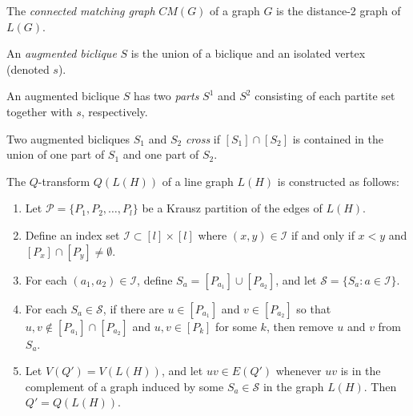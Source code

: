 



\begin{mydef}
	The \textit{connected matching graph} $CM(G)$ of a graph $G$ is the distance-2 graph of $L(G)$.
\end{mydef}

\begin{mydef}
	An \textit{augmented biclique} $S$ is the union of a biclique and an isolated vertex (denoted $s$).
\end{mydef}

\begin{mydef}
	An augmented biclique $S$ has two \textit{parts} $S^1$ and $S^2$ consisting of each partite set together with $s$, respectively. 
\end{mydef}

\begin{mydef}
	Two augmented bicliques $S_1$ and $S_2$ \textit{cross} if $[S_1] \cap [S_2]$ is contained in the union of one part of $S_1$ and one part of $S_2$.
\end{mydef}

\begin{mydef}
	The $Q$-transform $Q(L(H))$ of a line graph $L(H)$ is constructed as follows:
	\begin{enumerate}
		\item Let $\mathcal{P} = \{P_1, P_2, \ldots, P_l\}$ be a Krausz partition of the edges of $L(H)$.
		\item Define an index set $\mathcal{I} \subset [l] \times [l]$ where $(x,y) \in 
\mathcal{I}$ if and only if $x < y$ and $[P_x] \cap [P_y] \neq \emptyset$.
		\item For each $(a_1, a_2) \in \mathcal{I}$, define $S_a = [P_{a_1}] \cup [P_{a_2}]$, and let $\mathcal{S} = \{S_a: a \in \mathcal{I}\}$.
		\item For each $S_a \in \mathcal{S}$, if there are $u \in [P_{a_1}]$ and $v \in [P_{a_2}]$ so that $u,v \notin [P_{a_1}] \cap [P_{a_2}]$ and $u,v \in [P_k]$ for some $k$, then remove $u$ and $v$ from $S_a$.
		\item Let $V(Q') = V(L(H))$, and let $uv \in E(Q')$ whenever $uv$ is in the complement of a graph induced by some $S_a \in \mathcal{S}$ in the graph $L(H)$.  Then $Q' = Q(L(H))$.
	\end{enumerate}
\end{mydef}


